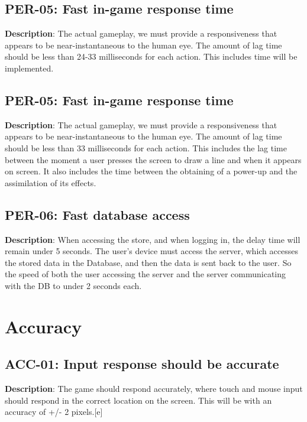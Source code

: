\subsection{PER-05: Fast in-game response time}
\textbf{Description}: The actual gameplay, we must provide a responsiveness
that appears to be near-instantaneous to the human eye. The amount of lag time
should be less than 24-33 milliseconds for each action. This includes
time will be implemented.

\subsection{PER-05: Fast in-game response time}
\textbf{Description}: The actual gameplay, we must provide a responsiveness
that appears to be near-instantaneous to the human eye. The amount of lag time
should be less than 33 milliseconds for each action. This includes
the lag time between the moment a user presses the screen to draw
a line and when it appears on screen. It also includes the time between
the obtaining of a power-up and the assimilation of its effects.

\subsection{PER-06: Fast database access}
\textbf{Description}: When accessing the store, and when logging in, the delay
time will remain under 5 seconds. The user\textquoteright{}s device
must access the server, which accesses the stored data in the Database,
and then the data is sent back to the user. So the speed of both the
user accessing the server and the server communicating with the DB
to under 2 seconds each.

\section{Accuracy}

\subsection{ACC-01: Input response should be accurate}
\textbf{Description}: The game should respond accurately, where touch and mouse
input should respond in the correct location on the screen. This will
be with an accuracy of +/- 2 pixels.{[}e{]}


